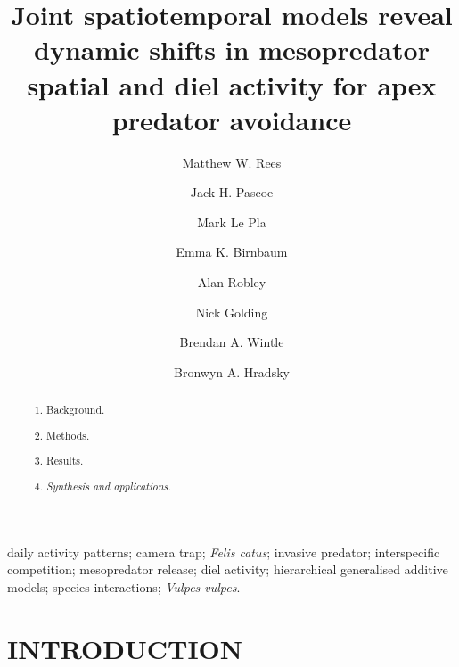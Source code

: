 \documentclass[]{elsarticle} %
\providecommand{\tightlist}{%
  \setlength{\itemsep}{0pt}\setlength{\parskip}{0pt}}
\begin{document}
\begin{frontmatter}

  \title{Joint spatiotemporal models reveal dynamic shifts in mesopredator spatial and diel activity for apex predator avoidance}
    \author[UOM]{Matthew W. Rees}
    \author[CEC]{Jack H. Pascoe}
  
    \author[CEC]{Mark Le Pla}
  
    \author[CEC]{Emma K. Birnbaum}
  
    \author[ARI]{Alan Robley}
  
    \author[CU,TKI]{Nick Golding}
  
    \author[UOM]{Brendan A. Wintle}
  
    \author[UOM]{Bronwyn A. Hradsky}
  
      \address[UOM]{Quantitative \& Applied Ecology Group, School of Ecosystem and Forest Science, The University of Melbourne, Parkville, VIC, Australia}
    \address[CEC]{Conservation Ecology Centre, Otway Lighthouse Rd, Cape Otway, VIC, Australia}
    \address[ARI]{Department of Environment, Land, Water and Planning, Arthur Rylah Institute for Environmental Research, Heidelberg, Australia}
    \address[CU]{Curtin University, Bentley, WA, Australia}
    \address[TKI]{Telethon Kids Institute, Perth Children's Hospital, Nedlands, WA, Australia}
  
  \begin{abstract}
  \begin{enumerate}
  \def\labelenumi{\arabic{enumi}.}
  \tightlist
  \item
    Background.
  \item
    Methods.
  \item
    Results.
  \item
    \emph{Synthesis and applications.}
  \end{enumerate}
  \end{abstract}
   \begin{keyword} daily activity patterns; camera trap; \emph{Felis catus}; invasive predator; interspecific competition; mesopredator release; diel activity; hierarchical generalised additive models; species interactions; \emph{Vulpes vulpes}.\end{keyword}
 \end{frontmatter}

\parskip=12pt

\newpage

\hypertarget{introduction}{%
\section{INTRODUCTION}\label{introduction}}
\end{document}
